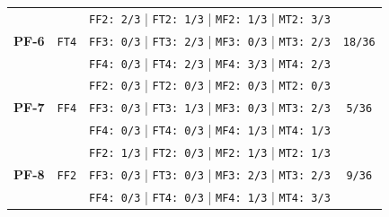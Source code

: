 \begin{table}[H]
\begin{center}
\begin{tabular}[c]{ |c|c|c|c|}
\multirow{3}{*}{\textbf{PF-6}} & \multirow{3}{*}{\texttt{FT4}}
&   \texttt{FF2: 2/3}  |  \texttt{FT2: 1/3}  |  \texttt{MF2: 1/3}  |  \texttt{MT2: 3/3} & \multirow{3}{*}{\texttt{18/36}} \\
& & \texttt{FF3: 0/3}  |  \texttt{FT3: 2/3}  |  \texttt{MF3: 0/3}  |  \texttt{MT3: 2/3} & \\
& & \texttt{FF4: 0/3}  |  \texttt{FT4: 2/3}  |  \texttt{MF4: 3/3}  |  \texttt{MT4: 2/3} & \\
\hline
\multirow{3}{*}{\textbf{PF-7}} & \multirow{3}{*}{\texttt{FF4}}
&   \texttt{FF2: 0/3}  |  \texttt{FT2: 0/3}  |  \texttt{MF2: 0/3}  |  \texttt{MT2: 0/3} & \multirow{3}{*}{\texttt{5/36}} \\
& & \texttt{FF3: 0/3}  |  \texttt{FT3: 1/3}  |  \texttt{MF3: 0/3}  |  \texttt{MT3: 2/3} & \\
& & \texttt{FF4: 0/3}  |  \texttt{FT4: 0/3}  |  \texttt{MF4: 1/3}  |  \texttt{MT4: 1/3} & \\
\hline
\multirow{3}{*}{\textbf{PF-8}} & \multirow{3}{*}{\texttt{FF2}}
&   \texttt{FF2: 1/3}  |  \texttt{FT2: 0/3}  |  \texttt{MF2: 1/3}  |  \texttt{MT2: 1/3} & \multirow{3}{*}{\texttt{9/36}} \\
& & \texttt{FF3: 0/3}  |  \texttt{FT3: 0/3}  |  \texttt{MF3: 2/3}  |  \texttt{MT3: 2/3} & \\
& & \texttt{FF4: 0/3}  |  \texttt{FT4: 0/3}  |  \texttt{MF4: 1/3}  |  \texttt{MT4: 3/3} & \\
\hline


\end{tabular}
\end{center}
\end{table}
